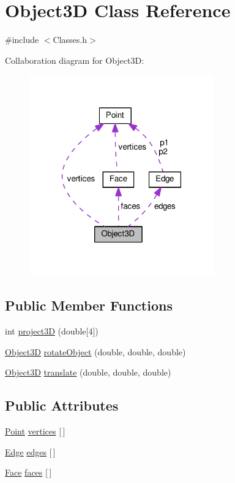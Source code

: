 \hypertarget{class_object3_d}{}\section{Object3D Class Reference}
\label{class_object3_d}


{\ttfamily \#include $<$Classes.\+h$>$}



Collaboration diagram for Object3D\+:
\nopagebreak
\begin{figure}[H]
\begin{center}
\leavevmode
\includegraphics[width=226pt]{class_object3_d__coll__graph}
\end{center}
\end{figure}
\subsection*{Public Member Functions}
\begin{DoxyCompactItemize}
\item 
int \hyperlink{class_object3_d_a17e177a936a71e0a5599ce7ca76bae78}{project3D} (double\mbox{[}4\mbox{]})
\item 
\hyperlink{class_object3_d}{Object3D} \hyperlink{class_object3_d_a476b3de610cb30be0b050b4701ba4701}{rotate\+Object} (double, double, double)
\item 
\hyperlink{class_object3_d}{Object3D} \hyperlink{class_object3_d_afb299c53794e9f4fb708efbde24c9a21}{translate} (double, double, double)
\end{DoxyCompactItemize}
\subsection*{Public Attributes}
\begin{DoxyCompactItemize}
\item 
\hyperlink{class_point}{Point} \hyperlink{class_object3_d_a23cc82ea4ef0af8e0e22871bdbdba6c6}{vertices} \mbox{[}$\,$\mbox{]}
\item 
\hyperlink{class_edge}{Edge} \hyperlink{class_object3_d_ad93f210748663a4d0aaa89287dee3dae}{edges} \mbox{[}$\,$\mbox{]}
\item 
\hyperlink{class_face}{Face} \hyperlink{class_object3_d_a4cc7f57059a990a8573a7644a4d3ab2a}{faces} \mbox{[}$\,$\mbox{]}
\end{DoxyCompactItemize}
